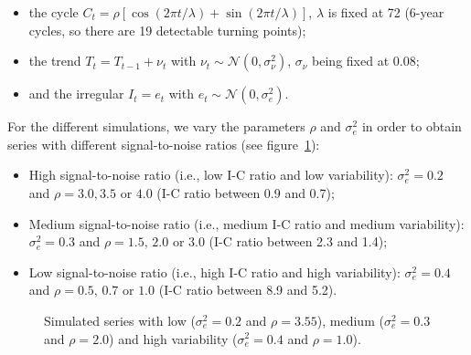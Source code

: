 \documentclass[
]{article}
\newcommand\1{\mathds{1}}
\begin{document}
\begin{itemize}
\item
  the cycle
  \(C_t = \rho [\cos (2 \pi t / \lambda) +\sin (2 \pi t / \lambda)]\),
  \(\lambda\) is fixed at 72 (6-year cycles, so there are 19 detectable
  turning points);
\item
  the trend \(T_t = T_{t-1} + \nu_t\) with
  \(\nu_t \sim \mathcal{N}(0, \sigma_\nu^2)\), \(\sigma_\nu\) being
  fixed at \(0.08\);
\item
  and the irregular \(I_t = e_t\) with
  \(e_t \sim \mathcal{N}(0, \sigma_e^2)\).
\end{itemize}

For the different simulations, we vary the parameters \(\rho\) and
\(\sigma_e^2\) in order to obtain series with different signal-to-noise
ratios (see figure~\ref{fig-graphs-data-simul}):

\begin{itemize}
\item
  High signal-to-noise ratio (i.e., low I-C ratio and low variability):
  \(\sigma_e^2=0.2\) and \(\rho = 3.0, 3.5\) or \(4.0\) (I-C ratio
  between 0.9 and 0.7);
\item
  Medium signal-to-noise ratio (i.e., medium I-C ratio and medium
  variability): \(\sigma_e^2=0.3\) and \(\rho = 1.5,\, 2.0\) or \(3.0\)
  (I-C ratio between 2.3 and 1.4);
\item
  Low signal-to-noise ratio (i.e., high I-C ratio and high variability):
  \(\sigma_e^2=0.4\) and \(\rho = 0.5,\, 0.7\) or \(1.0\) (I-C ratio
  between 8.9 and 5.2).
\end{itemize}

\begin{figure}[H]

\caption{\label{fig-graphs-data-simul}Simulated series with low
(\(\sigma_e^2=0.2\) and \(\rho = 3.55\)), medium (\(\sigma_e^2=0.3\) and
\(\rho = 2.0\)) and high variability (\(\sigma_e^2=0.4\) and
\(\rho = 1.0\)).}


\end{figure}%
\end{document}
